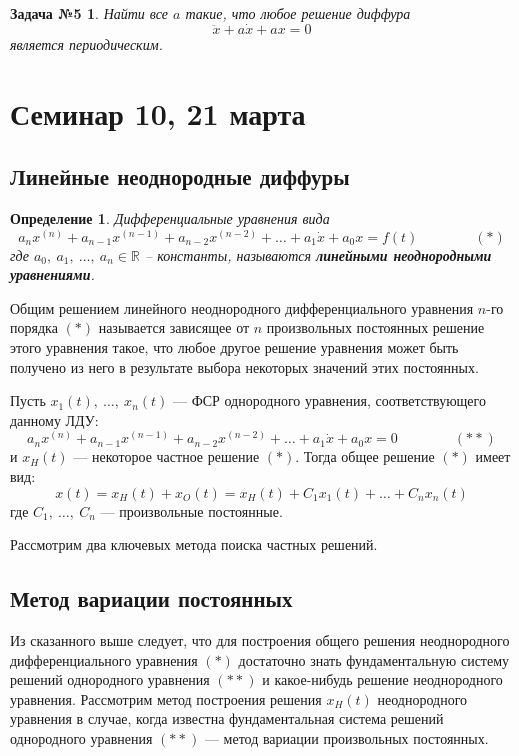 \documentclass[a4paper,12pt]{article}
\newtheorem{definition}{Определение}
\newtheorem*{task5}{Задача №5}
\newcommand{\R}{\mathbb{R}}
\newcommand{\dx}{\dot{x}}
\newcommand{\ddx}{\ddot{x}}
\begin{document}
\begin{task5}
Найти все $a$ такие, что любое решение диффура \[\ddx + a\dx + ax = 0\] является периодическим.
\end{task5}
%	

\newpage
\section{Семинар 10, 21 марта}

\subsection{Линейные неоднородные диффуры}

\begin{definition}
	Дифференциальные уравнения вида
	\[a_nx^{(n)} + a_{n - 1}x^{(n - 1)} + a_{n - 2}x^{(n - 2)} + \ldots + a_1\dx + a_0 x = f(t)\qquad \qquad (*)\]
	где $a_0,\ a_1,\ \ldots,\ a_n \in \R$ -- константы, называются \textbf{линейными неоднородными уравнениями}.
\end{definition}

Общим решением линейного неоднородного дифференциального уравнения $n$-го порядка $(*)$ называется зависящее от $n$ произвольных постоянных решение этого уравнения такое, что любое другое решение уравнения  может быть получено из него в результате выбора некоторых значений этих постоянных.

Пусть $x_1(t),\ \ldots,\ x_n(t)$ --- ФСР однородного уравнения, соответствующего данному ЛДУ:
\[a_nx^{(n)} + a_{n - 1}x^{(n - 1)} + a_{n - 2}x^{(n - 2)} + \ldots + a_1\dx + a_0 x = 0\qquad \qquad (**)\]
и $x_H(t)$ --- некоторое частное решение $(*)$. 
Тогда общее решение $(*)$ имеет вид:
\[x(t) = x_H(t) + x_O(t) = x_H(t) + C_1x_1(t) + \ldots + C_nx_n(t)\]
где $C_1,\ \ldots,\ C_n$ --- произвольные постоянные.

Рассмотрим два ключевых метода поиска частных решений. 

\subsection{Метод вариации постоянных}

Из сказанного выше следует, что для построения общего решения неоднородного дифференциального уравнения $(*)$ достаточно знать фундаментальную систему решений однородного уравнения $(**)$ и какое-нибудь решение неоднородного уравнения. 
Рассмотрим метод построения решения $x_H(t)$ неоднородного уравнения в случае, когда известна фундаментальная система решений однородного уравнения $(**)$ --- метод вариации произвольных постоянных.
\end{document}
